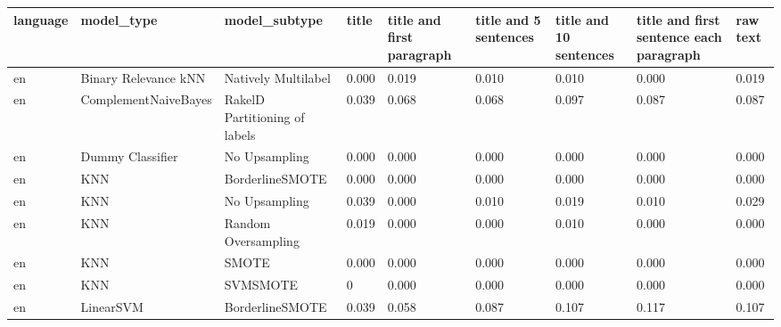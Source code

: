 \begin{tabular}{lllllllll}
\toprule
language &                      model\_type &                 model\_subtype &     title & title and first paragraph & title and 5 sentences & title and 10 sentences & title and first sentence each paragraph &  raw text \\
\midrule
      en &            Binary Relevance kNN &           Natively Multilabel &     0.000 &                     0.019 &                 0.010 &                  0.010 &                                   0.000 &     0.019 \\
      en &            ComplementNaiveBayes & RakelD Partitioning of labels &     0.039 &                     0.068 &                 0.068 &                  0.097 &                                   0.087 &     0.087 \\
      en &                Dummy Classifier &                 No Upsampling &     0.000 &                     0.000 &                 0.000 &                  0.000 &                                   0.000 &     0.000 \\
      en &                             KNN &               BorderlineSMOTE &     0.000 &                     0.000 &                 0.000 &                  0.000 &                                   0.000 &     0.000 \\
      en &                             KNN &                 No Upsampling &     0.039 &                     0.000 &                 0.010 &                  0.019 &                                   0.010 &     0.029 \\
      en &                             KNN &           Random Oversampling &     0.019 &                     0.000 &                 0.000 &                  0.010 &                                   0.000 &     0.000 \\
      en &                             KNN &                         SMOTE &     0.000 &                     0.000 &                 0.000 &                  0.000 &                                   0.000 &     0.000 \\
      en &                             KNN &                      SVMSMOTE &         0 &                     0.000 &                 0.000 &                  0.000 &                                   0.000 &     0.000 \\
      en &                       LinearSVM &               BorderlineSMOTE &     0.039 &                     0.058 &                 0.087 &                  0.107 &                                   0.117 &     0.107 \\

\end{tabular}
